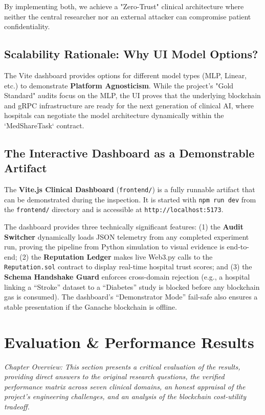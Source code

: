 \documentclass[10pt, a4paper, twocolumn]{article}
\begin{document}
By implementing both, we achieve a "Zero-Trust" clinical architecture where neither the central researcher nor an external attacker can compromise patient confidentiality.

\subsection{Scalability Rationale: Why UI Model Options?}
The Vite dashboard provides options for different model types (MLP, Linear, etc.) to demonstrate \textbf{Platform Agnosticism}. While the project's "Gold Standard" audits focus on the MLP, the UI proves that the underlying blockchain and gRPC infrastructure are ready for the next generation of clinical AI, where hospitals can negotiate the model architecture dynamically within the `MedShareTask` contract.

\subsection{The Interactive Dashboard as a Demonstrable Artifact}
The \textbf{Vite.js Clinical Dashboard} (\texttt{frontend/}) is a fully runnable artifact that can be demonstrated during the inspection. It is started with \texttt{npm run dev} from the \texttt{frontend/} directory and is accessible at \texttt{http://localhost:5173}.

The dashboard provides three technically significant features: (1) the \textbf{Audit Switcher} dynamically loads JSON telemetry from any completed experiment run, proving the pipeline from Python simulation to visual evidence is end-to-end; (2) the \textbf{Reputation Ledger} makes live Web3.py calls to the \texttt{Reputation.sol} contract to display real-time hospital trust scores; and (3) the \textbf{Schema Handshake Guard} enforces cross-domain rejection (e.g., a hospital linking a ``Stroke'' dataset to a ``Diabetes'' study is blocked before any blockchain gas is consumed). The dashboard's ``Demonstrator Mode'' fail-safe also ensures a stable presentation if the Ganache blockchain is offline.

\section{Evaluation \& Performance Results}
\label{sec:evaluation}

\textit{Chapter Overview: This section presents a critical evaluation of the results, providing direct answers to the original research questions, the verified performance matrix across seven clinical domains, an honest appraisal of the project's engineering challenges, and an analysis of the blockchain cost-utility tradeoff.}
\end{document}
